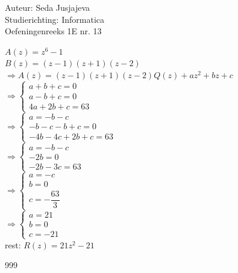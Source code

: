 \documentclass[a4paper]{article}
\begin{document}
\noindent \large Auteur: Seda Jusjajeva\\
\noindent \large Studierichting: Informatica\\
\noindent \large Oefeningenreeks 1E nr. 13\\

\medskip

\normalsize


$A(z) = z^6 - 1$ \\

$B(z) = (z - 1)(z + 1)(z - 2)$ \\

$\Rightarrow A(z) = (z - 1)(z + 1)(z - 2)Q(z) + az^2 + bz + c$ \\

$\Rightarrow \left\{
	\begin{array}{l}
	a + b + c = 0 \\
	a - b + c = 0 \\
	4a + 2b + c = 63
	\end{array}
\right .$\\

$\Rightarrow \left\{
	\begin{array}{l}
	  a = -b - c \\
	-b - c - b + c = 0  \\
	-4b - 4c + 2b + c = 63
	\end{array}
\right .$\\

$\Rightarrow \left\{
	\begin{array}{l}
	  a = -b - c \\
	-2b = 0  \\
	-2b - 3c = 63
	\end{array}
\right .$\\

$\Rightarrow \left\{
	\begin{array}{l}
	  a = -c \\
	b = 0  \\
	c = -\dfrac{63}{3}
	\end{array}
\right .$\\

$\Rightarrow \left\{
	\begin{array}{l}
	  a = 21 \\
	b = 0  \\
	c = -21
	\end{array}
\right .$\\

rest: $R(z) = 21z^2 - 21$



\begin{thebibliography}{999}
\end{thebibliography}
\end{document}
